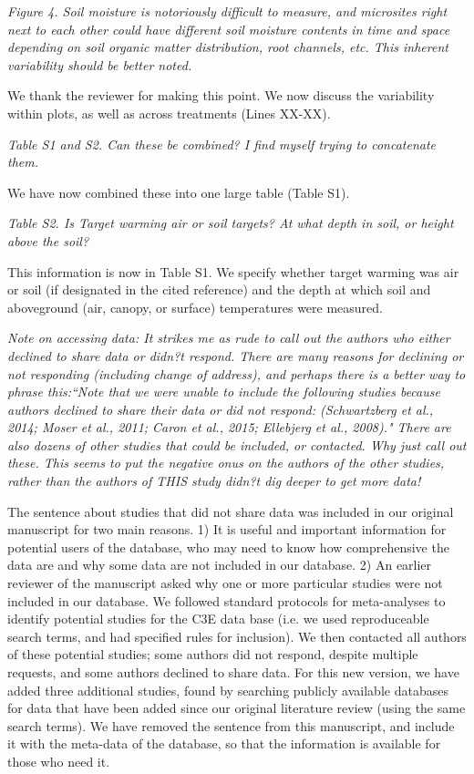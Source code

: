 \documentclass[11pt,a4paper]{letter}
\begin{document}
\par \emph{Figure 4.  Soil moisture is notoriously difficult to measure, and microsites right next to each other could have different soil moisture contents in time and space depending on soil organic matter distribution, root channels, etc.  This inherent variability should be better noted.}
\par We thank the reviewer for making this point. We now discuss the variability within plots, as well as across treatments (Lines XX-XX).

\par \emph{Table S1 and S2.  Can these be combined?  I find myself trying to concatenate them.}
\par We have now combined these into one large table (Table S1).

\par \emph{Table S2.  Is Target warming air or soil targets?  At what depth in soil, or height above the soil?}

\par This information is now in Table S1. We specify whether target warming was air or soil (if designated in the cited reference) and the depth at which soil and aboveground (air, canopy, or surface) temperatures were measured. 

\par \emph{Note on accessing data:  It strikes me as rude to call out the authors who either declined to share data or didn?t respond.  There are many reasons for declining or not responding (including change of address), and perhaps there is a better way to phrase this:``Note that we were unable to include the following studies because authors declined to share their data or did not respond: (Schwartzberg et al., 2014; Moser et al., 2011; Caron et al., 2015; Ellebjerg et al., 2008)." There are also dozens of other studies that could be included, or contacted.  Why just call out these.  This seems to put the negative onus on the authors of the other studies, rather than the authors of THIS study didn?t dig deeper to get more data!}

\par The sentence about studies that did not share data was included in our original manuscript for two main reasons. 1) It is useful and important information for potential users of the database, who may need to know how comprehensive the data are and why some data are not included in our database. 2) An earlier reviewer of the manuscript asked why one or more particular studies were not included in our database. We followed standard protocols for meta-analyses to identify potential studies for the C3E data base (i.e. we used reproduceable search terms, and had specified rules for inclusion). We then contacted all authors of these potential studies; some authors did not respond, despite multiple requests, and some authors declined to share data.  For this new version, we have added three additional studies, found by searching publicly available databases for data that have been added since our original literature review (using the same search terms). We have removed the sentence from this manuscript, and include it with the meta-data of the database, so that the information is available for those who need it.
\end{document}
